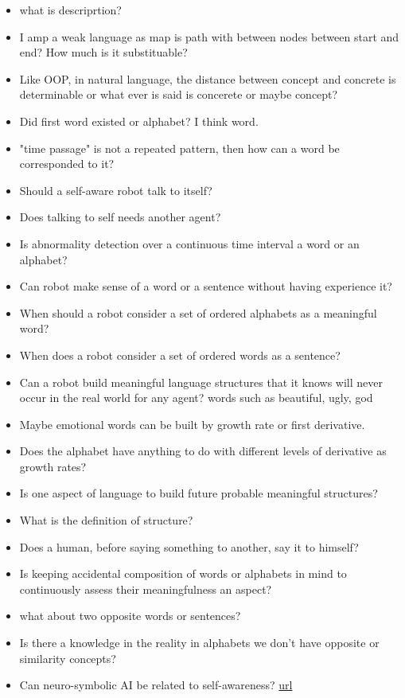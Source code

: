 \documentclass{book}
\begin{document}
\begin{itemize}
    \item what is descriprtion?
    \item I amp a weak language as map is path with between nodes between start and end? How much is it substituable?
    \item Like OOP, in natural language, the distance between concept and concrete is determinable or what ever is said is concerete or maybe concept?
    \item Did first word existed or alphabet? I think word.
    \item "time passage" is not a repeated pattern, then how can a word be corresponded to it?
    \item Should a self-aware robot talk to itself?
    \item Does talking to self needs another agent?
    \item Is abnormality detection over a continuous time interval a word or an alphabet?
    \item Can robot make sense of a word or a sentence without having experience it?
    \item When should a robot consider a set of ordered alphabets as a meaningful word?
    \item When does a robot consider a set of ordered words as a sentence?
    \item Can a robot build meaningful language structures that it knows will never occur in the real world for any agent? words such as beautiful, ugly, god
    \item Maybe emotional words can be built by growth rate or first derivative.
    \item Does the alphabet have anything to do with different levels of derivative as growth rates?
    \item Is one aspect of language to build future probable meaningful structures?
    \item What is the definition of structure?
    \item Does a human, before saying something to another, say it to himself?
    \item Is keeping accidental composition of words or alphabets in mind to continuously assess their meaningfulness an aspect?
    \item what about two opposite words or sentences?
    \item Is there a knowledge in the reality in alphabets we don't have opposite or similarity concepts?
    \item Can neuro-symbolic AI be related to self-awareness? \href{https://en.wikipedia.org/wiki/Neuro-symbolic_AI}{url}

\end{itemize}
\end{document}
